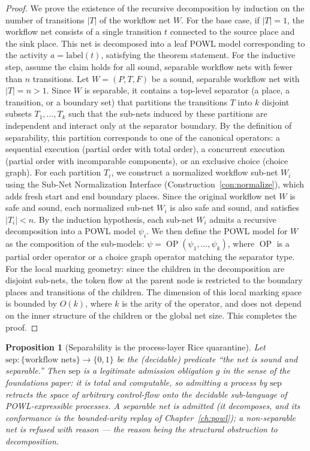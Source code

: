 \documentclass[11pt,oneside]{book}
\theoremstyle{definition}
\theoremstyle{plain}
\newtheorem{proposition}[theorem]{Proposition}
\theoremstyle{remark}
\begin{document}
\begin{proof}
We prove the existence of the recursive decomposition by induction on the number of transitions $|T|$ of the workflow net $W$.%
For the base case, if $|T| = 1$, the workflow net consists of a single transition $t$ connected to the source place and the sink place.%
This net is decomposed into a leaf POWL model corresponding to the activity $a = \text{label}(t)$, satisfying the theorem statement.%
For the inductive step, assume the claim holds for all sound, separable workflow nets with fewer than $n$ transitions.%
Let $W = (P, T, F)$ be a sound, separable workflow net with $|T| = n > 1$.%
Since $W$ is separable, it contains a top-level separator (a place, a transition, or a boundary set) that partitions the transitions $T$ into $k$ disjoint subsets $T_1, \dots, T_k$ such that the sub-nets induced by these partitions are independent and interact only at the separator boundary.%
By the definition of separability, this partition corresponds to one of the canonical operators: a sequential execution (partial order with total order), a concurrent execution (partial order with incomparable components), or an exclusive choice (choice graph).%
For each partition $T_i$, we construct a normalized workflow sub-net $W_i$ using the Sub-Net Normalization Interface (Construction~\ref{con:normalize}), which adds fresh start and end boundary places.%
Since the original workflow net $W$ is safe and sound, each normalized sub-net $W_i$ is also safe and sound, and satisfies $|T_i| < n$.%
By the induction hypothesis, each sub-net $W_i$ admits a recursive decomposition into a POWL model $\psi_i$.%
We then define the POWL model for $W$ as the composition of the sub-models: $\psi = \operatorname{OP}(\psi_1, \dots, \psi_k)$, where $\operatorname{OP}$ is a partial order operator or a choice graph operator matching the separator type.%
For the local marking geometry: since the children in the decomposition are disjoint sub-nets, the token flow at the parent node is restricted to the boundary places and transitions of the children.%
The dimension of this local marking space is bounded by $O(k)$, where $k$ is the arity of the operator, and does not depend on the inner structure of the children or the global net size.%
This completes the proof.%
\end{proof}

\begin{proposition}[Separability is the process-layer Rice quarantine]\label{prop:quarantine}
Let $\text{sep}:\{\text{workflow nets}\}\to\{0,1\}$ be the (decidable) predicate ``the net is
sound and separable.'' Then $\text{sep}$ is a legitimate admission obligation $g$ in the sense
of the foundations paper: it is total and computable, so admitting a process by $\text{sep}$
retracts the space of arbitrary control-flow onto the decidable sub-language of POWL-expressible
processes. A separable net is \emph{admitted} (it decomposes, and its conformance is the
bounded-arity replay of Chapter~\ref{ch:powl}); a non-separable net is \emph{refused with
reason} --- the reason being the structural obstruction to decomposition.
\end{proposition}
\end{document}
